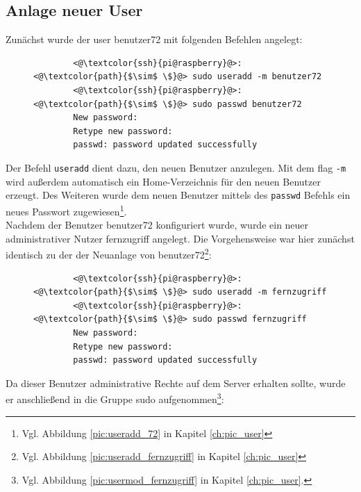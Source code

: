 \documentclass[a4paper, 11pt]{scrartcl}
\begin{document}
\subsection{Anlage neuer User}
Zunächst wurde der user \glqq benutzer72\grqq{} mit folgenden Befehlen angelegt:
\begin{figure}[H]
    \begin{mdframed}[backgroundcolor=bbg]
        \begin{lstlisting}
        <@\textcolor{ssh}{pi@raspberry}@>:<@\textcolor{path}{$\sim$ \$}@> sudo useradd -m benutzer72
        <@\textcolor{ssh}{pi@raspberry}@>:<@\textcolor{path}{$\sim$ \$}@> sudo passwd benutzer72
        New password:
        Retype new password:
        passwd: password updated successfully
        \end{lstlisting}
    \end{mdframed}
    \label{lst:user_72}
\end{figure}
Der Befehl \lstinline[basicstyle={\small\ttfamily\color{black}}]|useradd| dient dazu, den neuen Benutzer anzulegen. Mit dem flag \lstinline[basicstyle={\small\ttfamily\color{black}}]|-m| wird außerdem
automatisch ein Home-Verzeichnis für den neuen Benutzer erzeugt. Des Weiteren wurde dem neuen Benutzer mittels des \lstinline[basicstyle={\small\ttfamily\color{black}}]|passwd| Befehls ein neues Passwort
zugewiesen\footnote{Vgl. Abbildung \ref{pic:useradd_72} in Kapitel \ref{ch:pic_user}}.
\\
Nachdem der Benutzer benutzer72 konfiguriert wurde, wurde ein neuer administrativer Nutzer \glqq fernzugriff\grqq{} angelegt. Die Vorgehensweise war hier zunächst identisch zu der der Neuanlage von
benutzer72\footnote{Vgl. Abbildung \ref{pic:useradd_fernzugriff} in Kapitel \ref{ch:pic_user}}:
\begin{figure}[H]
    \begin{mdframed}[backgroundcolor=bbg]
        \begin{lstlisting}
        <@\textcolor{ssh}{pi@raspberry}@>:<@\textcolor{path}{$\sim$ \$}@> sudo useradd -m fernzugriff
        <@\textcolor{ssh}{pi@raspberry}@>:<@\textcolor{path}{$\sim$ \$}@> sudo passwd fernzugriff
        New password:
        Retype new password:
        passwd: password updated successfully
        \end{lstlisting}
    \end{mdframed}
    \label{lst:user_fernzugriff}
\end{figure}
Da dieser Benutzer administrative Rechte auf dem Server erhalten sollte, wurde er anschließend in die Gruppe \glqq sudo\grqq{} aufgenommen\footnote{Vgl. Abbildung \ref{pic:usermod_fernzugriff} in Kapitel \ref{ch:pic_user}.}:
\end{document}
